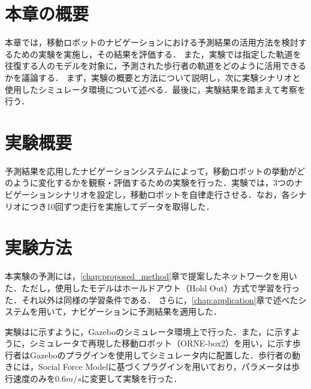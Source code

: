 
\vspace{-10pt}

\section{本章の概要}
本章では，移動ロボットのナビゲーションにおける予測結果の活用方法を検討するための実験を実施し，その結果を評価する．
また，実験では指定した軌道を往復する人のモデルを対象に，予測された歩行者の軌道をどのように活用できるかを議論する．
まず，実験の概要と方法について説明し，次に実験シナリオと使用したシミュレータ環境について述べる．最後に，実験結果を踏まえて考察を行う．

\section{実験概要}
予測結果を応用したナビゲーションシステムによって，移動ロボットの挙動がどのように変化するかを観察・評価するための実験を行った．実験では，3つのナビゲーションシナリオを設定し，移動ロボットを自律走行させる．なお，各シナリオにつき10回ずつ走行を実施してデータを取得した．

\section{実験方法}
本実験の予測には，\ref{chap:proposed_method}章で提案したネットワークを用いた．ただし，使用したモデルはホールドアウト（Hold Out）方式で学習を行った．それ以外は同様の学習条件である．
さらに，\ref{chap:application}章で述べたシステムを用いて，ナビゲーションに予測結果を適用した．

実験はに示すように，Gazebo\cite{Gazebo62:online}のシミュレータ環境上で行った．また，に示すように，シミュレータで再現した移動ロボット（ORNE-box2\cite{井口颯人2023屋外自律移動ロボットプラットフォーム-orne}）を用い，に示す歩行者はGazeboのプラグイン\cite{Actors-G87:online}を使用してシミュレータ内に配置した．歩行者の動きには，Social Force Model\cite{s-force-model}に基づくプラグイン\cite{techlife87:online-sfm-plugin}を用いており，パラメータは歩行速度のみを$0.6m/s$に変更して実験を行った．

